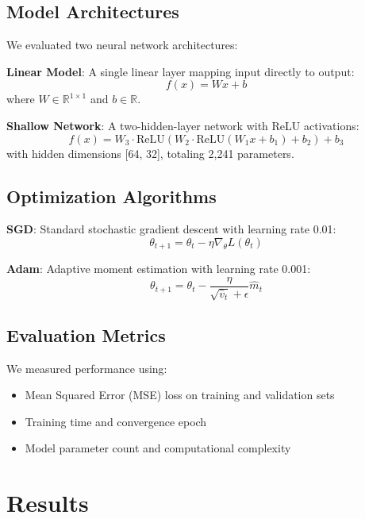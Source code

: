 \documentclass[11pt,twocolumn]{article}
\begin{document}
\subsection{Model Architectures}

We evaluated two neural network architectures:

\textbf{Linear Model}: A single linear layer mapping input directly to output:
\begin{equation}
f(x) = Wx + b
\end{equation}
where $W \in \mathbb{R}^{1 \times 1}$ and $b \in \mathbb{R}$.

\textbf{Shallow Network}: A two-hidden-layer network with ReLU activations:
\begin{equation}
f(x) = W_3 \cdot \text{ReLU}(W_2 \cdot \text{ReLU}(W_1 x + b_1) + b_2) + b_3
\end{equation}
with hidden dimensions [64, 32], totaling 2,241 parameters.

\subsection{Optimization Algorithms}

\textbf{SGD}: Standard stochastic gradient descent with learning rate 0.01:
\begin{equation}
\theta_{t+1} = \theta_t - \eta \nabla_\theta L(\theta_t)
\end{equation}

\textbf{Adam}: Adaptive moment estimation with learning rate 0.001:
\begin{equation}
\theta_{t+1} = \theta_t - \frac{\eta}{\sqrt{\hat{v}_t} + \epsilon} \hat{m}_t
\end{equation}

\subsection{Evaluation Metrics}

We measured performance using:
\begin{itemize}
    \item Mean Squared Error (MSE) loss on training and validation sets
    \item Training time and convergence epoch
    \item Model parameter count and computational complexity
\end{itemize}

\section{Results}
\end{document}
